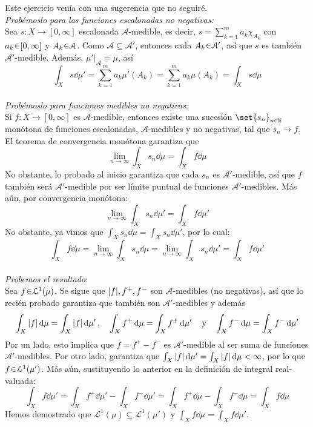 \begin{sol}
Este ejercicio venía con una sugerencia que no seguiré.\vspace{1em}\\
\emph{Probémoslo para las funciones escalonadas no negativas:}\\
Sea $s\colon X \to [0,\infty]$ escalonada $\mathcal{A}$-medible, es decir, $s = \sum^m_{k=1}a_k\chi_{A_k}$ con $a_k\en[0,\infty]$ y $A_k\en\mathcal{A}$. Como $\mathcal{A} \subseteq \mathcal{A}'$, entonces cada $A_k \en\mathcal{A}'$, así que $s$ es también $\mathcal{A}'$-medible. Además, $\mu'|_\mathcal{A} = \mu$, así
\[
\int_X s \dd{\mu'} = \sum^m_{k=1} a_k\mu'(A_k) = \sum^m_{k=1} a_k\mu(A_k) = \int_X s \dd{\mu}
\]
\\
\emph{Probémoslo para funciones medibles no negativas}:\\
Si $f\colon X \to [0,\infty]$ es $\mathcal{A}$-medible, entonces existe una sucesión $\set{s_n}_{n\en\mathbb{N}}$ monótona de funciones escalonadas, $\mathcal{A}$-medibles y no negativas, tal que $s_n \to f$. El teorema de convergencia monótona garantiza que 
\[
\lim_{n\to\infty} \int_Xs_n\dd{\mu} = \int_X f \dd{\mu}
\]
No obstante, lo probado al inicio garantiza que cada $s_n$ es $\mathcal{A}'$-medible, así que $f$ también será $\mathcal{A}'$-medible por ser límite puntual de funciones $\mathcal{A}'$-medibles. Más aún, por convergencia monótona:
\[
\lim_{n\to\infty} \int_Xs_n\dd{\mu'} = \int_X f \dd{\mu'}
\]
No obstante, ya vimos que $\int_X s_n \dd{\mu} = \int_X s_n \dd{\mu'}$, por lo cual:
\[
\int_X f \dd{\mu} = \lim_{n\to\infty} \int_Xs_n\dd{\mu} = \lim_{n\to\infty} \int_Xs_n\dd{\mu'} = \int_X f \dd{\mu'}
\]
\\
\emph{Probemos el resultado}:\\
Sea $f\en\mathcal{L}^1(\mu)$. Se sigue que $\abs{f},f^+,f^-$ son $\mathcal{A}$-medibles (no negativas), así que lo recién probado garantiza que también son $\mathcal{A}'$-medibles y además
\[
\int_X \abs{f} \dd{\mu} = \int_X \abs{f} \dd{\mu'},
\quad
\int_X f^+ \dd{\mu} = \int_X f^+ \dd{\mu'}
\quad\text{y}\quad
\int_X f^- \dd{\mu} = \int_X f^- \dd{\mu'}
\]
Por un lado, esto implica que $f = f^+ - f^-$ es $\mathcal{A}'$-medible al ser suma de funciones $\mathcal{A}'$-medibles. Por otro lado, garantiza que $\int_X \abs{f} \dd{\mu'} = \int_X \abs{f} \dd{\mu} < \infty$, por lo que $f\en\mathcal{L}^1(\mu')$. Más aún, sustituyendo lo anterior en la definición de integral real-valuada:
\[
\int_X f \dd{\mu'} 
= \int_X f^+ \dd{\mu'} - \int_X f^- \dd{\mu'}
= \int_X f^+ \dd{\mu} - \int_X f^- \dd{\mu}
= \int_X f \dd{\mu}
\]
Hemos demostrado que $\mathcal{L}^1(\mu) \subseteq \mathcal{L}^1(\mu')$ y $\int_X f \dd{\mu} = \int_X f \dd{\mu'}$.
\end{sol}